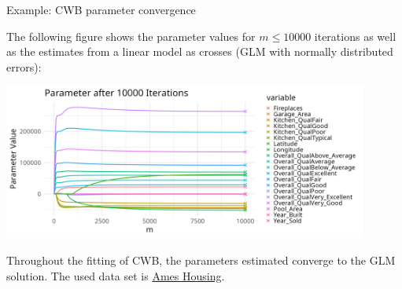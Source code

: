 \documentclass[11pt,compress,t,notes=noshow, xcolor=table]{beamer}
\begin{document}
\begin{vbframe}{Example: CWB parameter convergence}

The following figure shows the parameter values for $m \leq 10000$ iterations as well as the estimates from a linear model as crosses (GLM with normally distributed errors):

\begin{center}
\includegraphics[width=0.9\textwidth]{figure/compboost-to-glm-iter10000.png}
\end{center}

Throughout the fitting of CWB, the parameters estimated converge to the GLM solution. The used data set is \href{https://github.com/topepo/AmesHousing}{Ames Housing}.

\end{vbframe}


\endlecture
\end{document}
